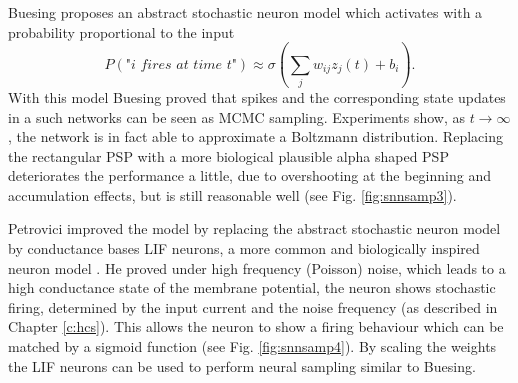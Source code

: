 Buesing proposes an abstract stochastic neuron model which activates with a probability proportional to the input
\[
P(\textit{"i fires at time t"}) \approx \sigma(\sum_j w_{ij} z_j(t) + b_i).
\]
With this model Buesing proved that spikes and the corresponding state updates in a such networks can be seen as MCMC sampling. Experiments show, as $t \rightarrow \infty$ , the network is in fact able to approximate a Boltzmann distribution.
Replacing the rectangular PSP with a more biological plausible alpha shaped PSP deteriorates the performance a little, due to overshooting at the beginning and accumulation effects, but is still reasonable well (see Fig. \ref{fig:snnsamp3}).

Petrovici improved the model by replacing the abstract stochastic neuron model by conductance bases LIF neurons, a more common and biologically inspired neuron model \cite{Petrovici2016}.
He proved under high frequency (Poisson) noise, which leads to a high conductance state of the membrane potential, the neuron shows stochastic firing, determined by the input current and the noise frequency (as described in Chapter \ref{c:hcs}).
This allows the neuron to show a firing behaviour which can be matched by a sigmoid function (see Fig. \ref{fig:snnsamp4}).  
By scaling the weights the LIF neurons can be used to perform neural sampling similar to Buesing.

